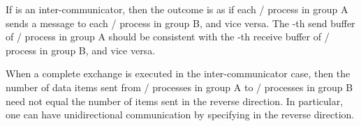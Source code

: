 If  is an inter-communicator, then the outcome is as if
each \MPI/ process in group A sends a message to each \MPI/ process in group B,
and vice versa.  The -th send buffer of \MPI/ process  in group A should
be consistent with the -th receive buffer of \MPI/ process  in group B,
and vice versa.

\begin{users}
When a complete exchange is executed in the inter-communicator case, then
the number of data items sent from \MPI/ processes in group A to \MPI/ processes
in group B need not equal the number of items sent in the reverse
direction.  In particular, one can have unidirectional communication
by specifying  in the reverse direction.
\end{users}


